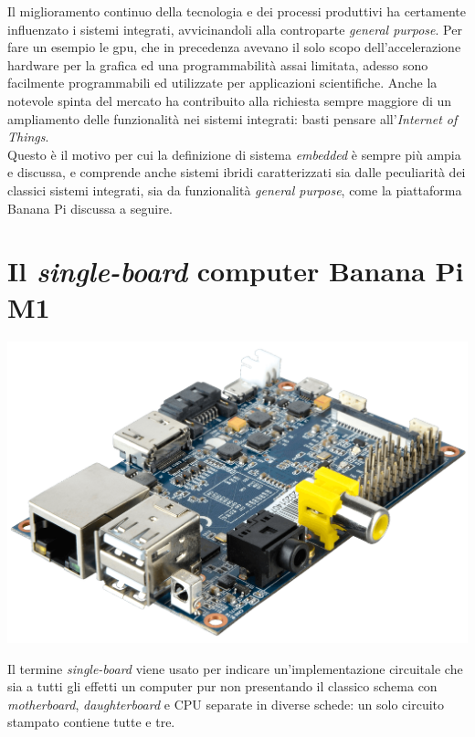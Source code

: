 Il miglioramento continuo della tecnologia e dei processi produttivi ha 
certamente influenzato i sistemi integrati, avvicinandoli alla controparte 
\emph{general purpose}. Per fare un esempio le gpu, che in precedenza avevano 
il solo 
scopo dell'accelerazione hardware per la grafica ed una programmabilità assai 
limitata, adesso sono facilmente programmabili ed utilizzate per applicazioni 
scientifiche. Anche la notevole spinta del mercato ha 
contribuito alla richiesta sempre maggiore di un ampliamento delle 
funzionalità nei sistemi integrati: basti pensare all'\emph{Internet of 
Things}. \\
Questo è il motivo per cui la definizione di sistema \emph{embedded} è sempre 
più ampia e discussa, e comprende anche sistemi ibridi caratterizzati sia 
dalle peculiarità dei classici sistemi integrati, sia da funzionalità 
\emph{general purpose}, come la piattaforma Banana Pi discussa a seguire.

\newpage
\section{Il \emph{single-board} computer Banana Pi M1}
\begin{center}
\includegraphics[scale=0.175]{Figures/bananapi.png}\\
\end{center}
Il termine \emph{single-board} viene usato per indicare un'implementazione 
circuitale che sia a tutti gli effetti un computer pur non presentando il 
classico schema con \emph{motherboard}, \emph{daughterboard} e CPU separate in 
diverse schede: un solo circuito stampato contiene tutte e tre.

